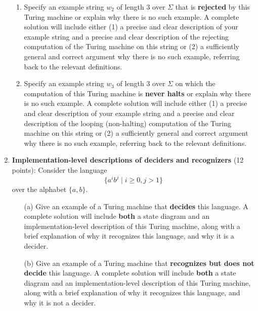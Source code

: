 \begin{enumerate}[wide, labelwidth=!, labelindent=0pt]
\begin{enumerate}
        \item\gradeCorrect Specify an example string $w_2$ of length $3$ over $\Sigma$ 
        that is {\bf rejected} by this Turing machine
        or explain why there is no such 
        example. A complete solution will include either (1) a precise and clear 
        description of your example  string and a precise and clear description of the rejecting computation
        of the Turing machine on this string or (2) a sufficiently
        general and correct argument why there is no such example, referring back to the relevant definitions.

        \item\gradeCorrect Specify an example string $w_3$ of length $3$ over $\Sigma$ 
        on which  the computation of this Turing machine is {\bf never halts}
        or explain why there is no such 
        example. A complete solution will include either (1) a precise and clear 
        description of your example  string and a precise and clear description of the looping (non-halting) 
        computation
        of the Turing machine on this string or (2) a sufficiently
        general and correct argument why there is no such example, referring back to the relevant definitions.

\end{enumerate}



\item\textbf{Implementation-level descriptions of deciders and recognizers} (12 points): Consider the language $$\{a^i b^j \mid i \geq 0, j > 1\}$$
over the alphabet $\{a,b\}$.

\begin{enumerate}
\item[(a)]\gradeCorrect Give an example of a Turing machine that {\bf decides} this language.
A complete solution will include  {\bf both} a state diagram and an implementation-level description 
of this Turing machine, along with a brief explanation of why it recognizes this language, and why it is a decider.

\item[(b)]\gradeCorrect Give an example of a Turing machine that {\bf recognizes but does not decide} this language.
A complete solution will include  {\bf both} a state diagram and an implementation-level description 
of this Turing machine, along with a brief explanation of why it recognizes this language, and why it is not a decider.


\end{enumerate}
\end{enumerate}
